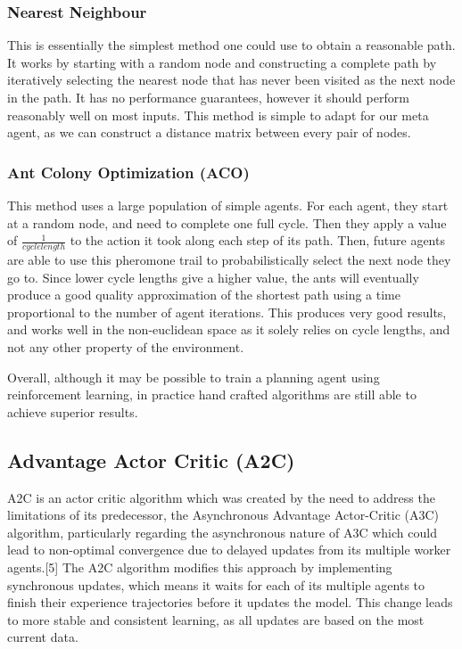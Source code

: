 \documentclass{article}
\begin{document}
    \subsubsection{Nearest Neighbour}
    \label{nearest_neighbour}
    This is essentially the simplest method one could use to obtain a reasonable path. It works by starting with a random node and constructing a complete path by iteratively selecting the nearest node that has never been visited as the next node in the path. It has no performance guarantees, however it should perform reasonably well on most inputs. This method is simple to adapt for our meta agent, as we can construct a distance matrix between every pair of nodes.
    
    \subsubsection{Ant Colony Optimization (ACO)}
    \label{aco}
    This method uses a large population of simple agents. For each agent, they start at a random node, and need to complete one full cycle. Then they apply a value of $\frac{1}{cycle length}$ to the action it took along each step of its path. Then, future agents are able to use this pheromone trail to probabilistically select the next node they go to. Since lower cycle lengths give a higher value, the ants will eventually produce a good quality approximation of the shortest path using a time proportional to the number of agent iterations. This produces very good results, and works well in the non-euclidean space as it solely relies on cycle lengths, and not any other property of the environment.
    
    Overall, although it may be possible to train a planning agent using reinforcement learning, in practice hand crafted algorithms are still able to achieve superior results.
    
    \subsection{Advantage Actor Critic (A2C)}
    \label{a2c}
    A2C is an actor critic algorithm which was created by the need to address the limitations of its predecessor, the Asynchronous Advantage Actor-Critic (A3C) algorithm, particularly regarding the asynchronous nature of A3C which could lead to non-optimal convergence due to delayed updates from its multiple worker agents.[5] The A2C algorithm modifies this approach by implementing synchronous updates, which means it waits for each of its multiple agents to finish their experience trajectories before it updates the model. This change leads to more stable and consistent learning, as all updates are based on the most current data.
\end{document}
